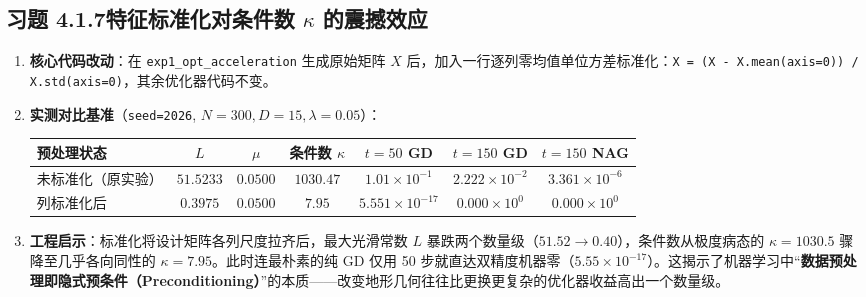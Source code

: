 \subsection*{习题 4.1.7\quad 特征标准化对条件数 $\kappa$ 的震撼效应}
\begin{enumerate}[label=(\arabic*), leftmargin=1.8em]
  \item \textbf{核心代码改动}：在 \texttt{exp1\_opt\_acceleration} 生成原始矩阵 $X$ 后，加入一行逐列零均值单位方差标准化：\texttt{X = (X - X.mean(axis=0)) / X.std(axis=0)}，其余优化器代码不变。
  \item \textbf{实测对比基准}（\texttt{seed=2026}, $N=300, D=15, \lambda=0.05$）：
  \begin{center}\footnotesize\setlength{\tabcolsep}{4pt}
  \begin{tabular}{@{}lcccccc@{}}
    \toprule
    \textbf{预处理状态} & $L$ & $\mu$ & 条件数 $\kappa$ & $t=50$ GD & $t=150$ GD & $t=150$ NAG \\
    \midrule
    未标准化（原实验） & $51.5233$ & $0.0500$ & $1030.47$ & $1.01\times 10^{-1}$ & $2.222\times 10^{-2}$ & $3.361\times 10^{-6}$ \\
    列标准化后 & $0.3975$ & $0.0500$ & $\mathbf{7.95}$ & $5.551\times 10^{-17}$ & $0.000\times 10^{0}$ & $0.000\times 10^{0}$ \\
    \bottomrule
  \end{tabular}
  \end{center}
  \item \textbf{工程启示}：标准化将设计矩阵各列尺度拉齐后，最大光滑常数 $L$ 暴跌两个数量级（$51.52 \to 0.40$），条件数从极度病态的 $\kappa = 1030.5$ 骤降至几乎各向同性的 $\kappa = 7.95$。此时连最朴素的纯 GD 仅用 50 步就直达双精度机器零（$5.55\times 10^{-17}$）。这揭示了机器学习中“\textbf{数据预处理即隐式预条件（Preconditioning）}”的本质——改变地形几何往往比更换更复杂的优化器收益高出一个数量级。
\end{enumerate}

